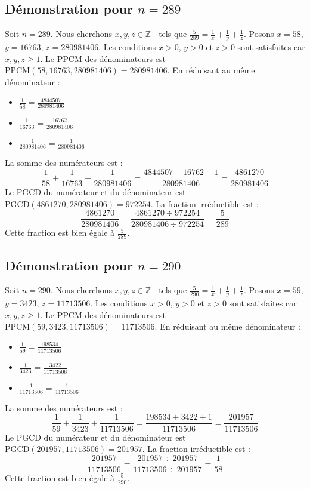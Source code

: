 \documentclass[11pt,a4paper]{article}
\begin{document}
\subsection{Démonstration pour $n = 289$}
Soit $n = 289$. Nous cherchons $x, y, z \in \mathbb{Z}^{+}$ tels que $\frac{5}{289} = \frac{1}{x} + \frac{1}{y} + \frac{1}{z}$.
Posons $x = 58$, $y = 16763$, $z = 280981406$.
Les conditions $x > 0$, $y > 0$ et $z > 0$ sont satisfaites car $x, y, z \geq 1$.
Le PPCM des dénominateurs est $\text{PPCM}(58, 16763, 280981406) = 280981406$.
En réduisant au même dénominateur :
\begin{itemize}
    \item $\frac{1}{58} = \frac{4844507}{280981406}$
    \item $\frac{1}{16763} = \frac{16762}{280981406}$
    \item $\frac{1}{280981406} = \frac{1}{280981406}$
\end{itemize}
La somme des numérateurs est :
$$ \frac{1}{58} + \frac{1}{16763} + \frac{1}{280981406} = \frac{4844507 + 16762 + 1}{280981406} = \frac{4861270}{280981406} $$
Le PGCD du numérateur et du dénominateur est $\text{PGCD}(4861270, 280981406) = 972254$.
La fraction irréductible est :
$$ \frac{4861270}{280981406} = \frac{4861270 \div 972254}{280981406 \div 972254} = \frac{5}{289} $$
Cette fraction est bien égale à $\frac{5}{289}$.

\subsection{Démonstration pour $n = 290$}
Soit $n = 290$. Nous cherchons $x, y, z \in \mathbb{Z}^{+}$ tels que $\frac{5}{290} = \frac{1}{x} + \frac{1}{y} + \frac{1}{z}$.
Posons $x = 59$, $y = 3423$, $z = 11713506$.
Les conditions $x > 0$, $y > 0$ et $z > 0$ sont satisfaites car $x, y, z \geq 1$.
Le PPCM des dénominateurs est $\text{PPCM}(59, 3423, 11713506) = 11713506$.
En réduisant au même dénominateur :
\begin{itemize}
    \item $\frac{1}{59} = \frac{198534}{11713506}$
    \item $\frac{1}{3423} = \frac{3422}{11713506}$
    \item $\frac{1}{11713506} = \frac{1}{11713506}$
\end{itemize}
La somme des numérateurs est :
$$ \frac{1}{59} + \frac{1}{3423} + \frac{1}{11713506} = \frac{198534 + 3422 + 1}{11713506} = \frac{201957}{11713506} $$
Le PGCD du numérateur et du dénominateur est $\text{PGCD}(201957, 11713506) = 201957$.
La fraction irréductible est :
$$ \frac{201957}{11713506} = \frac{201957 \div 201957}{11713506 \div 201957} = \frac{1}{58} $$
Cette fraction est bien égale à $\frac{5}{290}$.
\end{document}
